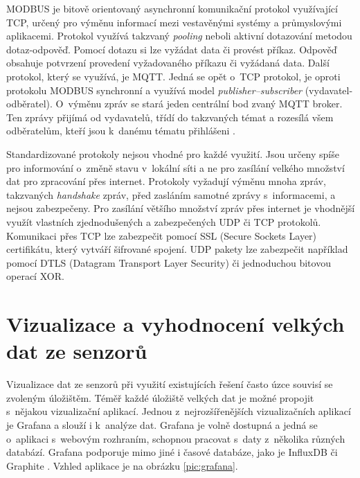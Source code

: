 MODBUS je bitově orientovaný asynchronní komunikační protokol využívající TCP, určený pro výměnu informací mezi vestavěnými systémy a průmyslovými aplikacemi. Protokol využívá takzvaný \textit{pooling} neboli aktivní dotazování metodou dotaz-odpověď. Pomocí dotazu si lze vyžádat data či provést příkaz. Odpověď obsahuje potvrzení provedení vyžadovaného příkazu či vyžádaná data. Další protokol, který se využívá, je MQTT. Jedná se opět o~TCP protokol, je oproti protokolu MODBUS synchronní a využívá model \textit{publisher–subscriber} (vydavatel-odběratel). O~výměnu zpráv se stará jeden centrální bod zvaný MQTT broker. Ten zprávy přijímá od vydavatelů, třídí do takzvaných témat a rozesílá všem odběratelům, kteří jsou k~danému tématu přihlášeni \cite{iotComm}. 

Standardizované protokoly nejsou vhodné pro každé využití. Jsou určeny spíše pro informování o~změně stavu v~lokální síti a ne pro zasílání velkého množství dat pro zpracování přes internet. Protokoly vyžadují výměnu mnoha zpráv, takzvaných \textit{handshake} zpráv, před zasláním samotné zprávy s~informacemi, a nejsou zabezpečeny. Pro zasílání většího množství zpráv přes internet je vhodnější využít vlastních zjednodušených a zabezpečených UDP či TCP protokolů. Komunikaci přes TCP lze zabezpečit pomocí SSL (Secure Sockets Layer) certifikátu, který vytváří šifrované spojení.
UDP pakety lze zabezpečit například pomocí DTLS (Datagram Transport Layer
Security) či jednoduchou bitovou operací XOR.



\section{Vizualizace a vyhodnocení velkých dat ze senzorů}
Vizualizace dat ze senzorů při využití existujících řešení často úzce souvisí se zvoleným úložištěm. Téměř každé úložiště velkých dat je možné propojit s~nějakou vizualizační aplikací. Jednou z~nejrozšířenějších vizualizačních aplikací je Grafana a slouží i k~analýze dat. Grafana je volně dostupná a jedná se o~aplikaci s~webovým rozhraním, schopnou pracovat s~daty z~několika různých databází. Grafana podporuje mimo jiné i časové databáze, jako je InfluxDB či Graphite \cite{grafana}. Vzhled aplikace je na obrázku \ref{pic:grafana}. 

